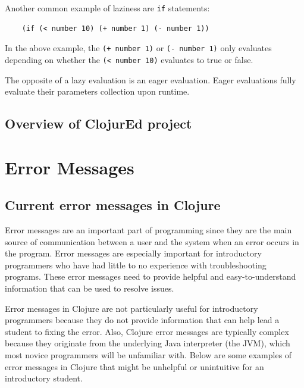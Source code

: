 \documentclass[12pt]{article}
\newcommand{\comment}[1]{{\bf \tt  {#1}}}
\newcommand{\emcomment}[1]{\textcolor{ForestGreen}{\comment{Elena: {#1}}}}
\begin{document}
Another common example of laziness are \texttt{if} statements:

\begin{verbatim}
	(if (< number 10) (+ number 1) (- number 1))
\end{verbatim}

In the above example, the \texttt{(+ number 1)} or \texttt{(- number 1)} only evaluates depending on
whether the \texttt{(< number 10)} evaluates to true or false.

The opposite of a lazy evaluation is an eager evaluation. Eager evaluations fully evaluate their
parameters collection upon runtime.


\subsection{Overview of ClojurEd project}\label{sec:project}

\section{Error Messages}\label{sec:errors}

\subsection{Current error messages in Clojure}\label{sec:currentem}
Error messages are an important part of programming since they are the main source of communication between a user and the system when an error occurs in the program.
Error messages are especially important for introductory programmers who have had little to no experience with troubleshooting programs. %
These error messages need to provide helpful and easy-to-understand information that can be used to resolve issues.

Error messages in Clojure are not particularly useful for introductory programmers because they do not provide information that can help lead a student to fixing the error.
Also, Clojure error messages are typically complex because they originate from the underlying Java interpreter (the JVM), which most %
novice programmers will be unfamiliar with.
Below are some examples of error messages in Clojure that might be unhelpful or unintuitive for an introductory student.
\end{document}
